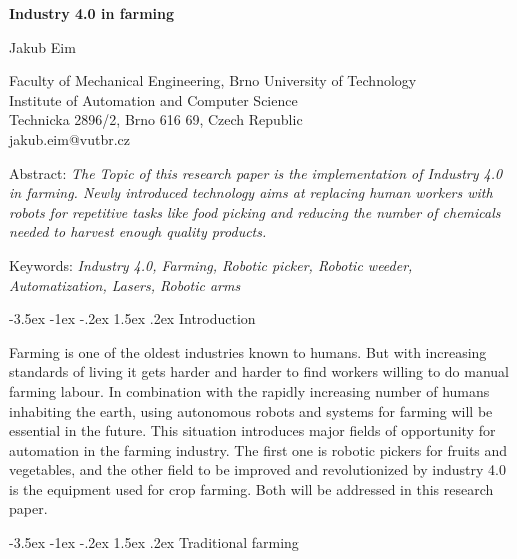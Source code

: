 \documentclass[a4paper,10pt]{article}
\makeatletter
\theoremstyle{definition}
\renewcommand\section{\@startsection {section}{1}{\z@}%
                                   {-3.5ex \@plus -1ex \@minus -.2ex}%
                                   {1.5ex \@plus.2ex}%
                                   {\large\bfseries}}
\makeatother
\begin{document}
\pagestyle{empty}

\begin{center}
{\bf \Large Industry 4.0 in farming}
\end{center}

\smallskip
\begin{center}
{\large Jakub Eim}
\end{center}

\smallskip
\begin{center}
Faculty of Mechanical Engineering, Brno University of Technology\\
Institute of Automation and Computer Science\\
Technicka 2896/2, Brno 616 69, Czech Republic\\
jakub.eim@vutbr.cz\\
\end{center}

\bigskip
\noindent Abstract: \textit{The Topic of this research paper is the implementation of Industry 4.0 in farming. Newly introduced technology aims at replacing human workers with robots for repetitive tasks like food picking and reducing the number of chemicals needed to harvest enough quality products. }

\vspace*{10pt} \noindent Keywords: \textit{Industry 4.0, Farming, Robotic picker, Robotic weeder, Automatization, Lasers, Robotic arms }

\bigskip
\section{Introduction}
\label{sec:1}

Farming is one of the oldest industries known to humans. But with increasing standards of living it gets harder and harder to find workers willing to do manual farming labour. In combination with the rapidly increasing number of humans inhabiting the earth, using autonomous robots and systems for farming will be essential in the future. This situation introduces major fields of opportunity for automation in the farming industry. The first one is robotic pickers for fruits and vegetables, and the other field to be improved and revolutionized by industry 4.0 is the equipment used for crop farming. Both will be addressed in this research paper.


\bigskip
\section{Traditional farming}
\label{sec:2}
\end{document}
